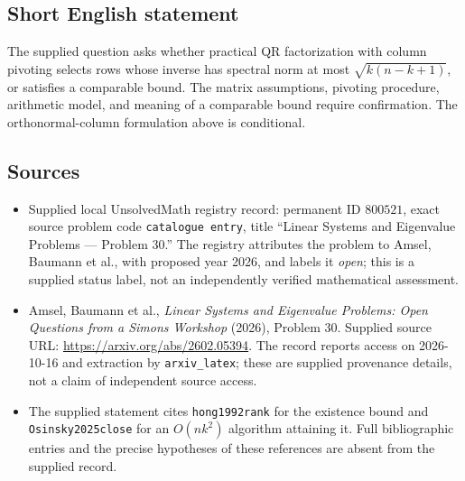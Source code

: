 \documentclass[11pt]{article}
\begin{document}
\subsection{Short English statement}
The supplied question asks whether practical QR factorization with column pivoting selects rows whose inverse has spectral norm at most \(\sqrt{k(n-k+1)}\), or satisfies a comparable bound. The matrix assumptions, pivoting procedure, arithmetic model, and meaning of a comparable bound require confirmation. The orthonormal-column formulation above is conditional.
\subsection{Sources}
\begin{itemize}
\item Supplied local UnsolvedMath registry record: permanent ID \(800521\), exact source problem code \texttt{catalogue entry}, title ``Linear Systems and Eigenvalue Problems --- Problem 30.'' The registry attributes the problem to Amsel, Baumann et al., with proposed year 2026, and labels it \emph{open}; this is a supplied status label, not an independently verified mathematical assessment.
\item Amsel, Baumann et al., \emph{Linear Systems and Eigenvalue Problems: Open Questions from a Simons Workshop} (2026), Problem 30. Supplied source URL: \url{https://arxiv.org/abs/2602.05394}. The record reports access on 2026-10-16 and extraction by \texttt{arxiv\_latex}; these are supplied provenance details, not a claim of independent source access.
\item The supplied statement cites \texttt{hong1992rank} for the existence bound and \texttt{Osinsky2025close} for an \(O(nk^2)\) algorithm attaining it. Full bibliographic entries and the precise hypotheses of these references are absent from the supplied record.
\end{itemize}
\end{document}
